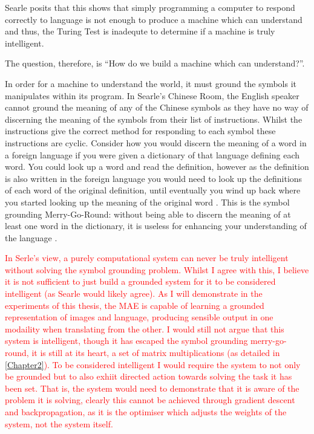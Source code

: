 Searle posits that this shows that simply programming a computer to respond correctly to language is not enough to produce a machine which can understand and thus, the Turing Test \cite{turing2009computing} is inadequte to determine if a machine is truly intelligent.

The question, therefore, is ``How do we build a machine which can understand?''.

In order for a machine to understand the world, it must ground the symbols it manipulates within its program. In Searle's Chinese Room, the English speaker cannot ground the meaning of any of the Chinese symbols as they have no way of discerning the meaning of the symbols from their list of instructions. Whilst the instructions give the correct method for responding to each symbol these instructions are cyclic. Consider how you would discern the meaning of a word in a foreign language if you were given a dictionary of that language defining each word. You could look up a word and read the definition, however as the definition is also written in the foreign language you would need to look up the definitions of each word of the original definition, until eventually you wind up back where you started looking up the meaning of the original word \cite{cangelosi2000robotic}. This is the symbol grounding Merry-Go-Round: without being able to discern the meaning of at least one word in the dictionary, it is useless for enhancing your understanding of the language \cite{harnad1990symbol}.

\textcolor{red}{In Serle's view, a purely computational system can never be truly intelligent without solving the symbol grounding problem. Whilst I agree with this, I believe it is not sufficient to just build a grounded system for it to be considered intelligent (as Searle would likely agree). As I will demonstrate in the experiments of this thesis, the \ac{MAE} is capable of learning a grounded representation of images and language, producing sensible output in one modaility when translating from the other. I would still not argue that this system is intelligent, though it has escaped the symbol grounding merry-go-round, it is still at its heart, a set of matrix multiplications (as detailed in \autoref{Chapter2}). To be considered intelligent I would require the system to not only be grounded but to also exhiit directed action towards solving the task it has been set. That is, the system would need to demonstrate that it is aware of the problem it is solving, clearly this cannot be achieved through gradient descent and backpropagation, as it is the optimiser which adjusts the weights of the system, not the system itself.}

